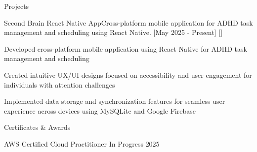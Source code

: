 \documentclass{resume} %
\begin{document}
\begin{rSection}{Projects}
    \begin{rProjects}{Second Brain React Native App}{Cross-platform mobile application for ADHD task management and scheduling using React Native.}
        [May 2025 - Present]
        []
        \begin{rItemize}
            \item Developed cross-platform mobile application using React Native for ADHD task management and scheduling
            \item Created intuitive UX/UI designs focused on accessibility and user engagement for individuals with attention challenges
            \item Implemented data storage and synchronization features for seamless user experience across devices using MySQLite and Google Firebase
        \end{rItemize}
    \end{rProjects}
\end{rSection}


\begin{rSection}{Certificates \& Awards}
    \begin{rOSubsection}
        {AWS Certified Cloud Practitioner}
        {In Progress}
        {2025}
    \end{rOSubsection}
\end{rSection}

\ATS{
}
\end{document}
